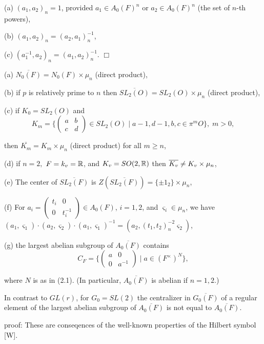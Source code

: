 (a) $(a_1,a_2)_n=1$, provided $a_1\in A_0(F)^n$ or $a_2\in A_0(F)^n$ (the
set of $n$-th powers),

(b) $(a_1,a_2)_n=(a_2,a_1)_n^{-1}$,

(c) $(a_1^{-1},a_2)_n=(a_1,a_2)_n^{-1}$. $\Box $

\begin{lemma}
(a) $\overline{N_0(F)}=N_0(F)\times \mu _n$ (direct product),

(b) if $p$ is relatively prime to $n$ then $\overline{SL_2(O)}=SL_2(O)\times
\mu _n$ (direct product),

(c) if $K_0=SL_2(O)$ and 
\[
K_m=\{\left( 
\begin{array}{cc}
a & b \\ 
c & d
\end{array}
\right) \in SL_2(O)\;|\;a-1,d-1,b,c\in \pi ^mO\},\;m>0,
\]

then $\overline{K_m}=K_m\times \mu _n$ (direct product) for all $m\geq n$,

(d) if $n=2,$ $F=k_v={\Bbb {R}}$, and $K_v=SO(2,{\Bbb {R})}$ then $\overline{%
K_v}\neq K_v\times \mu _n$,

(e) The center of $\overline{SL_2(F)}$ is $Z(\overline{SL_2(F)})=\{\pm
1_2\}\times \mu _n$,

(f) For $a_i=\left( 
\begin{array}{cc}
t_i & 0 \\ 
0 & t_i^{-1}
\end{array}
\right) \in A_0(F)$, $i=1,2$, and $\varsigma _i\in \mu _n$, we have $%
(a_1,\varsigma _1)\cdot (a_2,\varsigma _2)\cdot (a_1,\varsigma
_1)^{-1}=(a_2,(t_1,t_2)_n^{-2}\varsigma _2)$,

(g) the largest abelian subgroup of $\overline{A_0(F)}$ contains 
\[
C_F=\{\left( 
\begin{array}{cc}
a & 0 \\ 
0 & a^{-1}
\end{array}
\right) \;|\;a\in (F^{\times })^N\},
\]

where $N$ is as in (2.1). (In particular, $\overline{A_0(F)}$ is abelian if $%
n=1,2$.)
\end{lemma}

\begin{remark}
In contrast to $GL(r)$, for $G_0=SL(2)$ the centralizer in $\overline{G_0(F)}
$ of a regular element of the largest abelian subgroup of $\overline{A_0(F)}$
is not equal to $\overline{A_0(F)}$.
\end{remark}

proof: These are conseqences of the well-known properties of the Hilbert
symbol [W].

